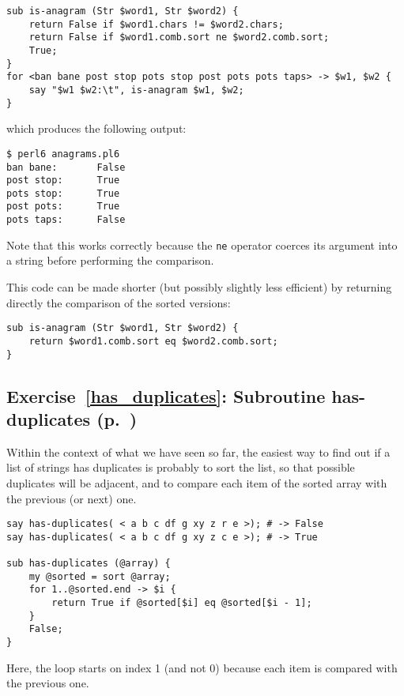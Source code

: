 \begin{verbatim}
sub is-anagram (Str $word1, Str $word2) {
    return False if $word1.chars != $word2.chars;
    return False if $word1.comb.sort ne $word2.comb.sort;
    True;
}
for <ban bane post stop pots stop post pots pots taps> -> $w1, $w2 {
    say "$w1 $w2:\t", is-anagram $w1, $w2;
}
\end{verbatim}

which produces the following output:
\begin{verbatim}
$ perl6 anagrams.pl6
ban bane:       False
post stop:      True
pots stop:      True
post pots:      True
pots taps:      False
\end{verbatim}

Note that this works correctly because the {\tt ne} 
operator coerces its argument into a string before 
performing the comparison.

This code can be made shorter (but possibly slightly less 
efficient) by returning directly the comparison of 
the sorted versions:

\begin{verbatim}
sub is-anagram (Str $word1, Str $word2) {
    return $word1.comb.sort eq $word2.comb.sort;
}
\end{verbatim}


\subsection{Exercise~\ref{has_duplicates}: Subroutine has-duplicates (p.~\pageref{has_duplicates})}
\label{sol_has_duplicates}

Within the context of what we have seen so far, the 
easiest way to find out if a list of strings has 
duplicates is probably to sort the list, so that 
possible duplicates will be adjacent, and to 
compare each item of the sorted array with the 
previous (or next) one.

\begin{verbatim}
say has-duplicates( < a b c df g xy z r e >); # -> False
say has-duplicates( < a b c df g xy z c e >); # -> True

sub has-duplicates (@array) {
    my @sorted = sort @array;
    for 1..@sorted.end -> $i {
        return True if @sorted[$i] eq @sorted[$i - 1];
    }
    False;
}
\end{verbatim}
%

Here, the loop starts on index 1 (and not 0) because 
each item is compared with the previous one.

